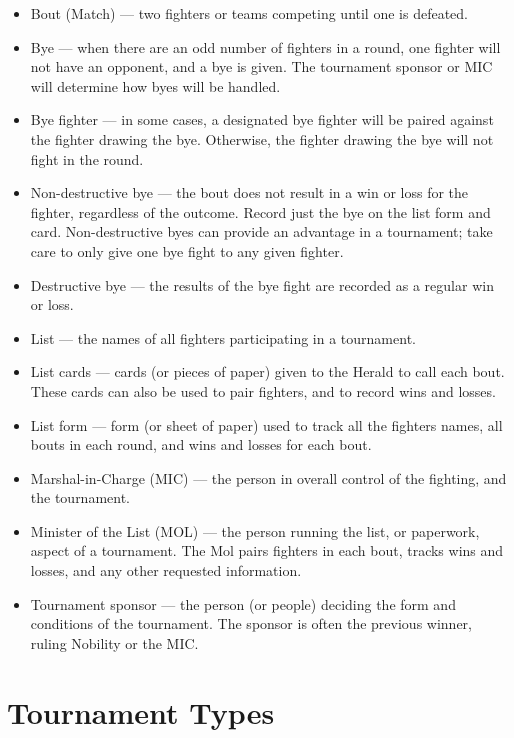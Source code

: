 \documentclass{article}
\begin{document}
\begin{itemize}
\item Bout (Match) --- two fighters or teams competing until one is defeated.
\item Bye --- when there are an odd number of fighters in a round, one fighter will not have an opponent, and
a bye is given. The tournament sponsor or MIC will determine how byes will be handled.
\item Bye fighter --- in some cases, a designated bye fighter will be paired against the fighter drawing
the bye. Otherwise, the fighter drawing the bye will not fight in the round.
\item Non-destructive bye --- the bout does not result in a win or loss for the fighter, regardless of the
outcome. Record just the bye on the list form and card. Non-destructive byes can provide an
advantage in a tournament; take care to only give one bye fight to any given fighter.
\item Destructive bye --- the results of the bye fight are recorded as a regular win or loss.
\item List --- the names of all fighters participating in a tournament.
\item List cards --- cards (or pieces of paper) given to the Herald to call each bout. These cards can also be
used to pair fighters, and to record wins and losses.
\item List form --- form (or sheet of paper) used to track all the fighters names, all bouts in each round, and
wins and losses for each bout.
\item Marshal-in-Charge (MIC) --- the person in overall control of the fighting, and the tournament.
\item Minister of the List (MOL) --- the person running the list, or paperwork, aspect of a tournament. The
Mol pairs fighters in each bout, tracks wins and losses, and any other requested information.
\item Tournament sponsor --- the person (or people) deciding the form and conditions of the tournament.
The sponsor is often the previous winner, ruling Nobility or the MIC.
\end{itemize}

\section{Tournament Types}
\end{document}
